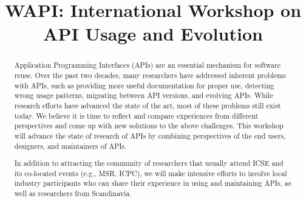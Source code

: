\documentclass[10pt, conference]{IEEEtran}
\newcommand{\shortname}{WAPI}
\begin{document}
\title{\shortname{}: International Workshop on API Usage and Evolution}


\newcommand\tud[0]{\textsuperscript{\normalfont \textdagger}}
\newcommand\iowa[0]{\textsuperscript{\normalfont \textparagraph}}
\newcommand\utd[0]{\textsuperscript{\normalfont \ddag}}
\newcommand\lanu[0]{\textsuperscript{\normalfont \textsection}}
\newcommand\ualberta[0]{\textsuperscript{\normalfont \textasteriskcentered}}

\author{
\and
{}
\and
{}
\and
{}
\and
{}
}


\maketitle


\begin{abstract}
Application Programming Interfaces (APIs) are an essential mechanism for software reuse. Over the past two decades, many researchers have addressed inherent problems with APIs, such as providing more useful documentation for proper use, detecting wrong usage patterns, migrating between API versions, and evolving APIs. While research efforts have advanced the state of the art, most of these problems still exist today. We believe it is time to reflect and compare experiences from different perspectives and come up with new solutions to the above challenges. This workshop will advance the state of research of APIs by combining perspectives of the end users, designers, and maintainers of APIs.

In addition to attracting the community of researchers that usually attend ICSE and its co-located events (e.g., MSR, ICPC), we will make intensive efforts to involve local industry participants who can share their experience in using and maintaining APIs, as well as researchers from Scandinavia.
\end{abstract}
\end{document}
